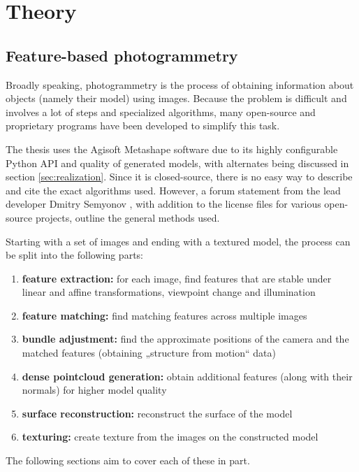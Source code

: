\chapter{Theory}\label{sec:theory}

\section{Feature-based photogrammetry}
Broadly speaking, photogrammetry is the process of obtaining information about objects (namely their model) using images.
Because the problem is difficult and involves a lot of steps and specialized algorithms, many open-source and proprietary programs have been developed to simplify this task.

The thesis uses the Agisoft Metashape software due to its highly configurable Python API and quality of generated models, with alternates being discussed in section \ref{sec:realization}.
Since it is closed-source, there is no easy way to describe and cite the exact algorithms used.
However, a forum statement from the lead developer Dmitry Semyonov \parencite{metashapeForumPost}, with addition to the license files for various open-source projects, outline the general methods used.

Starting with a set of images and ending with a textured model, the process can be split into the following parts:

\begin{enumerate}
	\item \textbf{feature extraction:} for each image, find features that are stable under linear and affine transformations, viewpoint change and illumination
	\item \textbf{feature matching:} find matching features across multiple images
	\item \textbf{bundle adjustment:} find the approximate positions of the camera and the matched features (obtaining „structure from motion“ data)
	\item \textbf{dense pointcloud generation:} obtain additional features (along with their normals) for higher model quality
	\item \textbf{surface reconstruction:} reconstruct the surface of the model
	\item \textbf{texturing:} create texture from the images on the constructed model
\end{enumerate}

The following sections aim to cover each of these in part.

